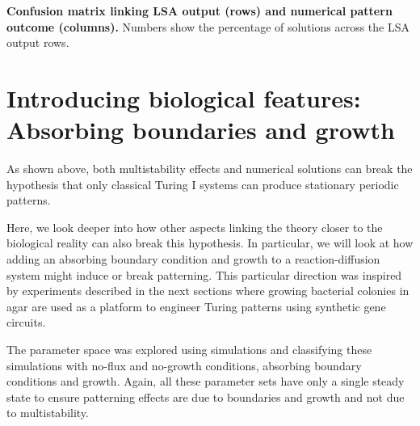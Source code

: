 \textbf{Confusion matrix linking LSA output (rows) and numerical pattern outcome (columns).} Numbers show the percentage of solutions across the LSA output rows.

\section{Introducing biological features: Absorbing boundaries and growth}
As shown above, both multistability effects and numerical solutions can break the hypothesis that only classical Turing I systems can produce stationary periodic patterns.

Here, we look deeper into how other aspects linking the theory closer to the biological reality can also break this hypothesis.
In particular, we will look at how adding an absorbing boundary condition and growth to a reaction-diffusion system might induce or break patterning.
This particular direction was inspired by experiments described in the next sections where growing bacterial colonies in agar are used as a platform to engineer Turing patterns using synthetic gene circuits.

The parameter space was explored using simulations and classifying these simulations with no-flux and no-growth conditions, absorbing boundary conditions and growth.
Again, all these parameter sets have only a single steady state to ensure patterning effects are due to boundaries and growth and not due to multistability.

